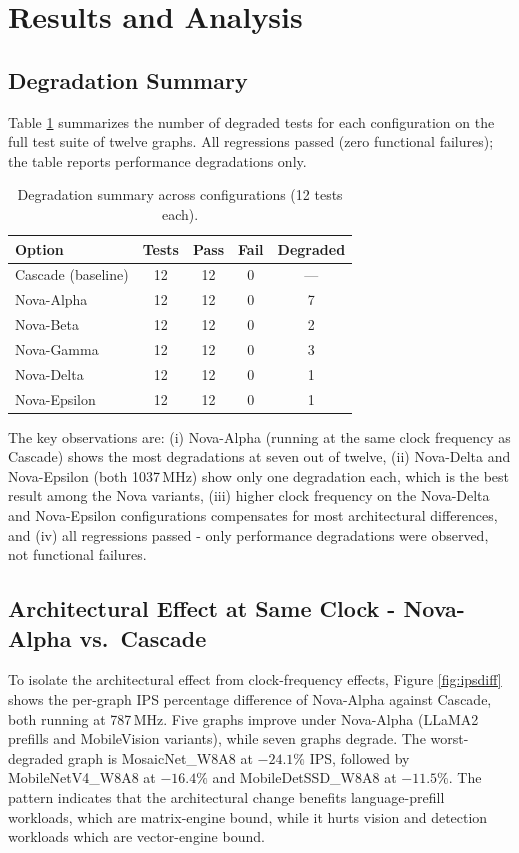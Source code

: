 \documentclass[conference]{IEEEtran}
\begin{document}
\section{Results and Analysis}

\subsection{Degradation Summary}
Table \ref{tab:degradation} summarizes the number of degraded tests for each configuration on the full test suite of twelve graphs. All regressions passed (zero functional failures); the table reports performance degradations only.

\begin{table}[t]
\caption{Degradation summary across configurations (12 tests each).}
\label{tab:degradation}
\centering
\begin{tabular}{|l|c|c|c|c|}
\hline
\textbf{Option} & \textbf{Tests} & \textbf{Pass} & \textbf{Fail} & \textbf{Degraded}\\
\hline
Cascade (baseline) & 12 & 12 & 0 & --- \\
\hline
Nova-Alpha & 12 & 12 & 0 & 7 \\
\hline
Nova-Beta & 12 & 12 & 0 & 2 \\
\hline
Nova-Gamma & 12 & 12 & 0 & 3 \\
\hline
Nova-Delta & 12 & 12 & 0 & 1 \\
\hline
Nova-Epsilon & 12 & 12 & 0 & 1 \\
\hline
\end{tabular}
\end{table}

The key observations are: (i) Nova-Alpha (running at the same clock frequency as Cascade) shows the most degradations at seven out of twelve, (ii) Nova-Delta and Nova-Epsilon (both 1037\,MHz) show only one degradation each, which is the best result among the Nova variants, (iii) higher clock frequency on the Nova-Delta and Nova-Epsilon configurations compensates for most architectural differences, and (iv) all regressions passed - only performance degradations were observed, not functional failures.

\subsection{Architectural Effect at Same Clock - Nova-Alpha vs.\ Cascade}
To isolate the architectural effect from clock-frequency effects, Figure \ref{fig:ipsdiff} shows the per-graph IPS percentage difference of Nova-Alpha against Cascade, both running at 787\,MHz. Five graphs improve under Nova-Alpha (LLaMA2 prefills and MobileVision variants), while seven graphs degrade. The worst-degraded graph is MosaicNet\_W8A8 at $-24.1\%$ IPS, followed by MobileNetV4\_W8A8 at $-16.4\%$ and MobileDetSSD\_W8A8 at $-11.5\%$. The pattern indicates that the architectural change benefits language-prefill workloads, which are matrix-engine bound, while it hurts vision and detection workloads which are vector-engine bound.
\end{document}

